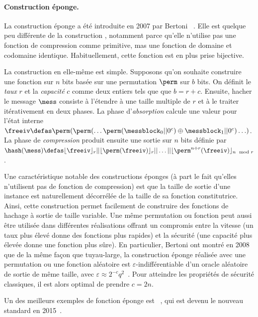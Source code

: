 \paragraph{Construction éponge.} La construction éponge a été introduite en 2007 par
Bertoni \etal~\cite{SpongeFunctions}.
Elle est quelque peu différente de la construction \merkdam, notamment parce qu'elle n'utilise pas une fonction de compression
comme primitive, mas une fonction de domaine et codomaine identique. Habituellement, cette fonction est en plus prise bijective.

La construction en elle-même est simple. Supposons qu'on souhaite construire une fonction sur $n$ bits basée sur une permutation $\perm$ sur $b$ bits.
On définit le \emph{taux} $r$ et la \emph{capacité} $c$ comme deux entiers tels que que $b = r + c$.
Ensuite, hacher le message
$\mess$ consiste à
l'étendre à une taille multiple de $r$ et à le traiter itérativement en deux phases.
La phase d'\emph{absorption} calcule une valeur pour l'état interne
$\freeiv \defas \perm(\perm(\ldots\perm(\messblock_0||0^c)\oplus\messblock_1||0^c)\ldots)$. La phase de \emph{compression} produit ensuite une sortie sur $n$ bits définie par
$\hash(\mess) \defas \lfloor\freeiv\rfloor_r||\lfloor\perm(\freeiv)\rfloor_r||\ldots||\lfloor\perm^{n \div r}(\freeiv)\rfloor_{n \mod r}$.

Une caractéristique notable des constructions éponges (à part le fait qu'elles n'utilisent pas de fonction de compression) est que la taille de sortie d'une instance
est naturellement décorrélée de la taille de sa fonction constitutrice. Ainsi, cette construction permet facilement de construire des fonctions de hachage à sortie
de taille variable. Une même permutation ou fonction peut aussi être utilisée dans différentes réalisations offrant un compromis entre la vitesse
(un taux plus élevé donne des fonctions plus rapides) et la sécurité (une capacité plus élevée donne une fonction plus sûre).
En particulier, Bertoni \etal ont montré en 2008 que de la même façon que \merkdam tuyau-large, la construction éponge réalisée avec une permutation ou une fonction aléatoire est
$\varepsilon$-indifférentiable d'un oracle aléatoire de sortie de même taille,
avec $\varepsilon \approx 2^{-c}q^2$~\cite{DBLP:conf/eurocrypt/BertoniDPA08}. Pour atteindre les propriétés de sécurité classiques, il est alors
optimal de prendre $c = 2n$.

Un des meilleurs exemples de fonction éponge est 
\keccak~\cite{KeccakReference}, qui est devenu le nouveau standard \shathree en 2015~\cite{Nist-SHA3}. 

